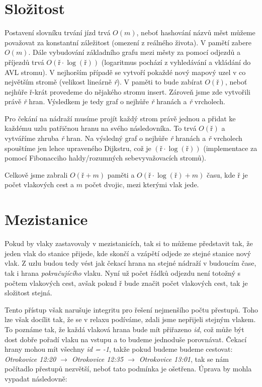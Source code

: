 \documentclass[a4paper]{article}
\begin{document}
\section{Složitost}
Postavení slovníku trvání jízd trvá $O(m)$, neboť hashování názvů měst můžeme považovat za konstantní záležitost (omezení z reálného života). V pamětí zabere $O(m)$. Dále vybudování základního grafu mezi městy za pomocí odjezdů a příjezdů trvá $O(\textit{ř} \cdot \log(\textit{ř}))$ (logaritmus pochází z vyhledávání a vkládání do AVL stromu). V nejhorším případě se vytvoří pokaždé nový mapový uzel v co největším stromě (velikost lineárně \textit{ř}). V paměti to bude zabírat $O(\textit{ř})$, neboť nejhůře ř-krát provedeme do nějakého stromu insert. Zároveň jsme zde vytvořili právě \textit{ř} hran. Výsledkem je tedy graf o nejhůře \textit{ř} hranách a \textit{ř} vrcholech.

Pro čekání na nádraží musíme projít každý strom právě jednou a přidat ke každému uzlu patřičnou hranu na svého následovníka. To trvá $O(\textit{ř})$ a vytváříme zhruba \textit{ř} hran. Na výsledný graf o nejhůře \textit{ř} hranách a \textit{ř} vrcholech spouštíme jen lehce upraveného Dijkstru, což je $(\textit{ř} \cdot \log(\textit{ř}))$ (implementace za pomocí Fibonacciho haldy/rozumných sebevyvažovacích stromů).

Celkově jsme zabrali $O(\textit{ř}+m)$ paměti a $O(\textit{ř}\cdot \log(\textit{ř}) + m)$ času, kde $\textit{ř}$ je počet vlakových cest a $m$ počet dvojic, mezi kterými vlak jede.


\section{Mezistanice}
Pokud by vlaky zastavovaly v mezistanicích, tak si to můžeme představit tak, že jeden vlak do stanice přijede, kde skončí a vzápětí odjede ze stejné stanice nový vlak. Z uzlu budou tedy vést jak čekací hrana na stejné nádraží v budoucím čase, tak i hrana \textit{pokračujícího} vlaku. Nyní už počet řádků odjezdu není totožný s počtem vlakových cest, avšak pokud $\textit{ř}$ bude značit počet vlakových cest, tak je složitost stejná.

Tento přístup však narušuje integritu pro řešení nejmenšího počtu přestupů. Toho lze však docílit tak, že se v relaxu podíváme, zdali jsme nepřijeli stejným vlakem. To poznáme tak, že každá vlaková hrana bude mít přiřazeno \textit{id}, což může být dost dobře pořadí vlaku na vstupu a to budeme jednoduše porovnávat. Čekací hrany mohou mít všechny \textit{id = -1}, takže pokud budeme budeme cestovat: \textit{Otrokovice 12:20 $\rightarrow$ Otrokovice 12:35 $\rightarrow$ Otrokovice 13:01}, tak se nám počítadlo přestupů nezvětší, neboť tato podmínka je ošetřena. Úprava by mohla vypadat následovně:
\end{document}
